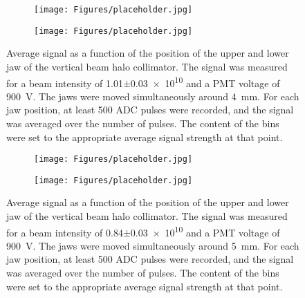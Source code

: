 \begin{figure}
\begin{subfigure}[b]{0.5\textwidth}
\texttt{[image: Figures/placeholder.jpg]}%
\end{subfigure}
\begin{subfigure}[b]{0.5\textwidth}
\texttt{[image: Figures/placeholder.jpg]}%
\end{subfigure}
\caption[RHUL Cherenkov detector signal for certain upper/lower jaw positions around \SI{4}{\milli\metre}, for a beam intensity of \num{1.01}$\pm$\num{0.03e10}]{Average signal as a function of the position of the upper and lower jaw of the vertical beam halo collimator. The signal was measured for a beam intensity of \num{1.01}$\pm$\num{0.03e10} and a PMT voltage of \SI{900}{\volt}. The jaws were moved simultaneously around \SI{4}{\milli\metre}. For each jaw position, at least 500 ADC pulses were recorded, and the signal was averaged over the number of pulses. The content of the bins were set to the appropriate average signal strength at that point.}
\label{fig:AverageSignal_Asymmetric_4mm_101}
\end{figure}
\begin{figure}
\begin{subfigure}[b]{0.5\textwidth}
\texttt{[image: Figures/placeholder.jpg]}%
\end{subfigure}
\begin{subfigure}[b]{0.5\textwidth}
\texttt{[image: Figures/placeholder.jpg]}%
\end{subfigure}
\caption[RHUL Cherenkov detector signal for certain upper/lower jaw positions around \SI{5}{\milli\metre}, for a beam intensity of \num{0.84}$\pm$\num{0.03e10}]{Average signal as a function of the position of the upper and lower jaw of the vertical beam halo collimator. The signal was measured for a beam intensity of \num{0.84}$\pm$\num{0.03e10} and a PMT voltage of \SI{900}{\volt}. The jaws were moved simultaneously around \SI{5}{\milli\metre}. For each jaw position, at least 500 ADC pulses were recorded, and the signal was averaged over the number of pulses. The content of the bins were set to the appropriate average signal strength at that point.}
\label{fig:AverageSignal_Asymmetric_5mm_084}
\end{figure}
